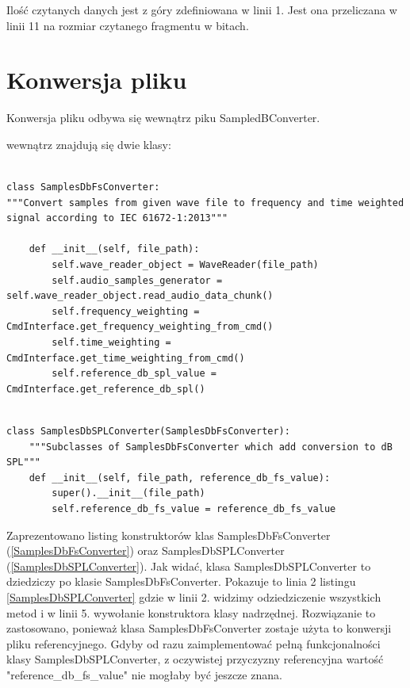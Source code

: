 \documentclass[eng,printmode]{mgr}
\begin{document}
Ilość czytanych danych jest z góry zdefiniowana w linii 1. Jest ona przeliczana w linii 11 na rozmiar czytanego fragmentu w bitach. 

\section{Konwersja pliku}
Konwersja pliku odbywa się wewnątrz piku SampledBConverter. 

wewnątrz znajdują się dwie klasy:

\begin{minipage}{\linewidth}
\begin{lstlisting}[caption={fragment kodu źródłowego pliku SampledBConverter.py, klasa SamplesDbFSConverter},captionpos=b,label={SamplesDbFsConverter}]

class SamplesDbFsConverter:
"""Convert samples from given wave file to frequency and time weighted signal according to IEC 61672-1:2013"""

    def __init__(self, file_path):
        self.wave_reader_object = WaveReader(file_path)
        self.audio_samples_generator = self.wave_reader_object.read_audio_data_chunk()
        self.frequency_weighting = CmdInterface.get_frequency_weighting_from_cmd()
        self.time_weighting = CmdInterface.get_time_weighting_from_cmd()
        self.reference_db_spl_value = CmdInterface.get_reference_db_spl()
\end{lstlisting}
\end{minipage}

\begin{minipage}{\linewidth}
\begin{lstlisting}[caption={fragment kodu źródłowego pliku SampledBConverter.py, klasa SamplesDbSPLConverter},captionpos=b,label={SamplesDbSPLConverter}]

class SamplesDbSPLConverter(SamplesDbFsConverter):
    """Subclasses of SamplesDbFsConverter which add conversion to dB SPL"""
    def __init__(self, file_path, reference_db_fs_value):
        super().__init__(file_path)
        self.reference_db_fs_value = reference_db_fs_value

\end{lstlisting}
\end{minipage}

Zaprezentowano listing konstruktorów klas SamplesDbFsConverter (\ref{SamplesDbFsConverter}) oraz  SamplesDbSPLConverter (\ref{SamplesDbSPLConverter}). Jak widać, klasa SamplesDbSPLConverter to dziedziczy po klasie SamplesDbFsConverter. Pokazuje to linia 2 listingu \ref{SamplesDbSPLConverter} gdzie w linii 2. widzimy odziedziczenie wszystkich metod i w linii 5. wywołanie konstruktora klasy nadrzędnej. Rozwiązanie to zastosowano, ponieważ klasa SamplesDbFsConverter zostaje użyta to konwersji pliku referencyjnego. Gdyby od razu zaimplementować pełną funkcjonalności klasy SamplesDbSPLConverter, z oczywistej przyczyzny referencyjna wartość "reference\_db\_fs\_value" nie mogłaby być jeszcze znana. 
\end{document}
